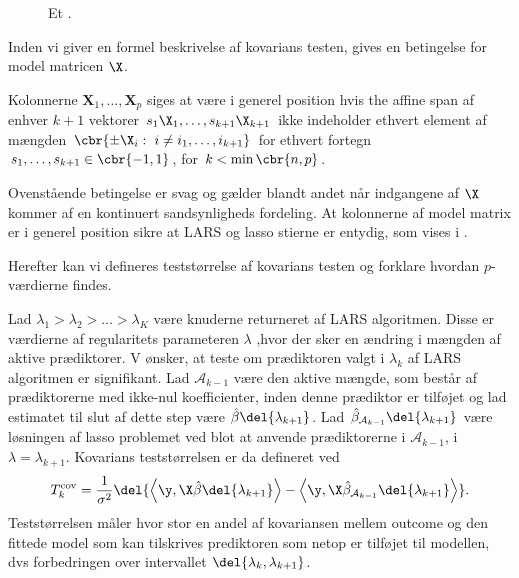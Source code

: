 %
\begin{figure}[H]
\centering
\caption{Et .}
\label{fig:covarians_test}
\end{figure}
%

Inden vi giver en formel beskrivelse af kovarians testen, gives en betingelse for model matricen \(\X\).
\begin{defn}
Kolonnerne \(\mathbf{X}_1, \ldots, \mathbf{X}_p\) siges at være i generel position hvis the affine span af enhver \(k+1\) vektorer \(s_1 \X_1, \ldots, s_{k+1} \X_{k+1}\) ikke indeholder ethvert element af mængden \(\cbr{\pm \X_i : \ i \neq i_1, \ldots, i_{k+1}}\) for ethvert fortegn \(s_1, \ldots, s_{k+1} \in \cbr{-1,1}\), for \(k < \min \cbr{n,p}\). 
\end{defn}
Ovenstående betingelse er svag og gælder blandt andet når indgangene af \(\X\) kommer af en kontinuert sandsynligheds fordeling.
At kolonnerne af model matrix er i generel position sikre at LARS og lasso stierne er entydig, som vises i \citep{lasso_unique}.

Herefter kan vi defineres teststørrelse af kovarians testen og forklare hvordan \(p\)-værdierne findes.




Lad $\lambda_1 > \lambda_2 > \ldots > \lambda_K$ være knuderne returneret af LARS algoritmen.
Disse er værdierne af regularitets parameteren $\lambda$ ,hvor der sker en ændring i mængden af aktive prædiktorer.
V ønsker, at teste om prædiktoren valgt i \(\lambda_k\) af LARS algoritmen er signifikant.
Lad \(\mathcal{A}_{k-1}\) være den aktive mængde, som består af prædiktorerne med ikke-nul koefficienter, inden denne prædiktor er tilføjet og lad estimatet til slut af dette step være \(\hat{\beta} \del{\lambda_{k+1}}\).
Lad \(\hat{\beta}_{\mathcal{A}_{k-1}} \del{\lambda_{k+1}}\) være løsningen af lasso problemet ved blot at anvende prædiktorerne  i \(\mathcal{A}_{k-1}\), i \(\lambda=\lambda_{k+1}\).
Kovarians teststørrelsen er da defineret ved
\begin{align}
T_k^\text{cov} = \frac{1}{\sigma^2} \del{ \left\langle \y, \X \hat{\beta} \del{\lambda_{k+1}} \right\rangle - \left\langle  \y, \X \hat{\beta}_{\mathcal{A}_{k-1}} \del{\lambda_{k+1}} \right\rangle}. \label{eq:6.5}
\end{align}
Teststørrelsen måler hvor stor en andel af kovariansen mellem outcome og den fittede model som kan tilskrives prediktoren som netop er tilføjet til modellen, dvs forbedringen over intervallet \(\del{\lambda_k, \lambda_{k+1}}\).

